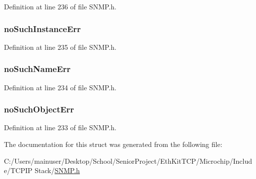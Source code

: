Definition at line 236 of file S\+N\+M\+P.\+h.

\hypertarget{structreq_var_err_status_a135fb82dfca01ff2b1ae21568a9df23a}{}
\subsubsection[{no\+Such\+Instance\+Err}]{ no\+Such\+Instance\+Err}\label{structreq_var_err_status_a135fb82dfca01ff2b1ae21568a9df23a}


Definition at line 235 of file S\+N\+M\+P.\+h.

\hypertarget{structreq_var_err_status_ab5e88e239aa10955b4f56116228f9244}{}
\subsubsection[{no\+Such\+Name\+Err}]{ no\+Such\+Name\+Err}\label{structreq_var_err_status_ab5e88e239aa10955b4f56116228f9244}


Definition at line 234 of file S\+N\+M\+P.\+h.

\hypertarget{structreq_var_err_status_a8af3c43b120d41b0db5837435ed5ee3a}{}
\subsubsection[{no\+Such\+Object\+Err}]{ no\+Such\+Object\+Err}\label{structreq_var_err_status_a8af3c43b120d41b0db5837435ed5ee3a}


Definition at line 233 of file S\+N\+M\+P.\+h.



The documentation for this struct was generated from the following file\+:\begin{DoxyCompactItemize}
\item 
C\+:/\+Users/mainuser/\+Desktop/\+School/\+Senior\+Project/\+Eth\+Kit\+T\+C\+P/\+Microchip/\+Include/\+T\+C\+P\+I\+P Stack/\hyperlink{_s_n_m_p_8h}{S\+N\+M\+P.\+h}\end{DoxyCompactItemize}
